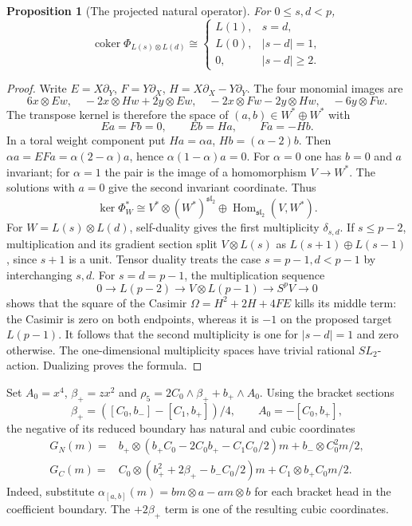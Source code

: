 \documentclass[11pt]{article}
\theoremstyle{plain}
\newtheorem{proposition}[proposition]{Proposition}
\theoremstyle{definition}
\theoremstyle{remark}
\numberwithin{equation}{section}
\newcommand{\slie}{\mathfrak{sl}_2}
\newcommand{\Hom}{\operatorname{Hom}}
\newcommand{\coker}{\operatorname{coker}}
\begin{document}
\begin{proposition}[The projected natural operator]\label{prop:c0-natural}
For $0\le s,d<p$,
\begin{equation}\label{eq:Phi-coker}
 \coker\Phi_{L(s)\otimes L(d)}\cong
 \begin{cases}
 L(1),&s=d,\\
 L(0),&|s-d|=1,\\
 0,&|s-d|\ge2.
 \end{cases}
\end{equation}
\end{proposition}
\begin{proof}
Write $E=X\partial_Y$, $F=Y\partial_X$, $H=X\partial_X-Y\partial_Y$.
The four monomial images are
\[
 6x\otimes Ew,\quad -2x\otimes Hw+2y\otimes Ew,\quad
 -2x\otimes Fw-2y\otimes Hw,\quad -6y\otimes Fw.
\]
The transpose kernel is therefore the space of $(a,b)\in W^*\oplus W^*$ with
\[
 Ea=Fb=0,\qquad Eb=Ha,\qquad Fa=-Hb.
\]
In a toral weight component put $Ha=\alpha a$, $Hb=(\alpha-2)b$.
Then $\alpha a=EFa=\alpha(2-\alpha)a$, hence
$\alpha(1-\alpha)a=0$.
For $\alpha=0$ one has $b=0$ and $a$ invariant;
for $\alpha=1$ the pair is the image of a homomorphism $V\to W^*$.
The solutions with $a=0$ give the second invariant coordinate.
Thus
\[
 \ker\Phi_W^*\cong
 V^*\otimes(W^*)^{\slie}\oplus\Hom_{\slie}(V,W^*).
\]
For $W=L(s)\otimes L(d)$, self-duality gives the first multiplicity
$\delta_{s,d}$. If $s\le p-2$, multiplication and its gradient section
split $V\otimes L(s)$ as $L(s+1)\oplus L(s-1)$, since $s+1$ is a unit.
Tensor duality treats the case $s=p-1,d<p-1$ by interchanging $s,d$.
For $s=d=p-1$, the multiplication sequence
\[
 0\longrightarrow L(p-2)\longrightarrow V\otimes L(p-1)
     \longrightarrow S^pV\longrightarrow0
\]
shows that the square of the Casimir
$\Omega=H^2+2H+4FE$ kills its middle term:
the Casimir is zero on both endpoints, whereas it is $-1$ on the
proposed target $L(p-1)$.
It follows that the second multiplicity is one for $|s-d|=1$ and zero
otherwise. The one-dimensional multiplicity spaces have trivial rational
$SL_2$-action. Dualizing proves the formula.
\end{proof}

Set $A_0=x^4$, $\beta_+=zx^2$ and
$\rho_5=2C_0\wedge\beta_++b_+\wedge A_0$.
Using the bracket sections
\[
 \beta_+=([C_0,b_-]-[C_1,b_+])/4,\qquad A_0=-[C_0,b_+],
\]
the negative of its reduced boundary has natural and cubic coordinates
\begin{equation}\label{eq:full-horizontal-graph}
\begin{aligned}
 G_N(m)={}&b_+\otimes(b_+C_0-2C_0b_+-C_1C_0/2)m
                   +b_-\otimes C_0^2m/2,\\
 G_C(m)={}&C_0\otimes(b_+^2+2\beta_+-b_-C_0/2)m
                   +C_1\otimes b_+C_0m/2.
\end{aligned}
\end{equation}
Indeed, substitute
$\alpha_{[a,b]}(m)=bm\otimes a-am\otimes b$
for each bracket head in the coefficient boundary.
The $+2\beta_+$ term is one of the resulting cubic coordinates.
\end{document}
